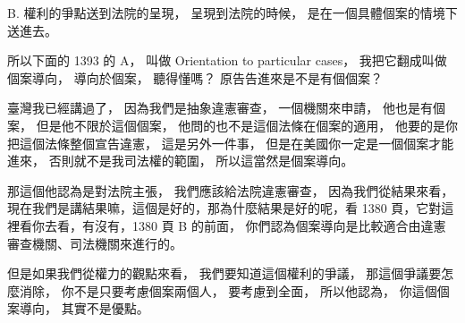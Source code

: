 \hypertarget{w06:cue:2482}{}B. 權利的爭點送到法院的呈現，
\hypertarget{w06:cue:2483}{}呈現到法院的時候，
\hypertarget{w06:cue:2484}{}是在一個具體個案的情境下送進去。

\hypertarget{w06:cue:2485}{}所以下面的 1393 的 A，
\hypertarget{w06:cue:2486}{}叫做 Orientation to particular cases，
\hypertarget{w06:cue:2487}{}我把它翻成叫做個案導向，
\hypertarget{w06:cue:2488}{}導向於個案，
\hypertarget{w06:cue:2489}{}聽得懂嗎？
\hypertarget{w06:cue:2490}{}原告告進來是不是有個個案？

\hypertarget{w06:cue:2491}{}臺灣我已經講過了，
\hypertarget{w06:cue:2492}{}因為我們是抽象違憲審查，
\hypertarget{w06:cue:2493}{}一個機關來申請，
\hypertarget{w06:cue:2494}{}他也是有個案，
\hypertarget{w06:cue:2495}{}但是他不限於這個個案，
\hypertarget{w06:cue:2496}{}他問的也不是這個法條在個案的適用，
\hypertarget{w06:cue:2497}{}他要的是你把這個法條整個宣告違憲，
\hypertarget{w06:cue:2498}{}這是另外一件事，
\hypertarget{w06:cue:2499}{}但是在美國你一定是一個個案才能進來，
\hypertarget{w06:cue:2500}{}否則就不是我司法權的範圍，
\hypertarget{w06:cue:2501}{}所以這當然是個案導向。

\hypertarget{w06:cue:2502}{}那這個他認為是對法院主張，
\hypertarget{w06:cue:2503}{}我們應該給法院違憲審查，
\hypertarget{w06:cue:2504}{}因為我們從結果來看，
\hypertarget{w06:cue:2505}{}現在我們是講結果嘛，這個是好的，那為什麼結果是好的呢，看 1380 頁，它對這裡看你去看，有沒有，1380 頁 B 的前面，
\hypertarget{w06:cue:2506}{}你們認為個案導向是比較適合由違憲審查機關、司法機關來進行的。

\hypertarget{w06:cue:2507}{}但是如果我們從權力的觀點來看，
\hypertarget{w06:cue:2508}{}我們要知道這個權利的爭議，
\hypertarget{w06:cue:2509}{}那這個爭議要怎麼消除，
\hypertarget{w06:cue:2510}{}你不是只要考慮個案兩個人，
\hypertarget{w06:cue:2511}{}要考慮到全面，
\hypertarget{w06:cue:2512}{}所以他認為，
\hypertarget{w06:cue:2513}{}你這個個案導向，
\hypertarget{w06:cue:2514}{}其實不是優點。

